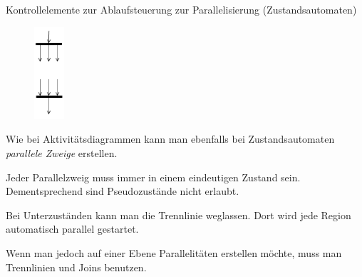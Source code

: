 \begin{diag}{Kontrollelemente zur Ablaufsteuerung zur Parallelisierung (Zustandsautomaten)}
    \begin{figure}
        \centering
        \includegraphics[width=0.1\textwidth]{includes/figures/defi_diagrams_state_parallel.pdf}
    \end{figure}
    Wie bei Aktivitätsdiagrammen kann man ebenfalls bei Zustandsautomaten \emph{parallele Zweige} erstellen.

    Jeder Parallelzweig muss immer in einem eindeutigen Zustand sein.
    Dementsprechend sind Pseudozustände nicht erlaubt.

    Bei Unterzuständen kann man die Trennlinie weglassen.
    Dort wird jede Region automatisch parallel gestartet.

    Wenn man jedoch auf einer Ebene Parallelitäten erstellen möchte, muss man Trennlinien und Joins benutzen.

    \vspace{0.5cm}
\end{diag}

